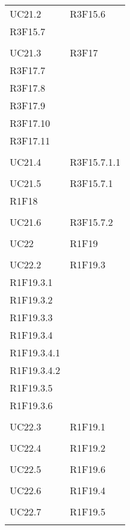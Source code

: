 \begin{longtable}{ >{\centering}p{}
		>{\centering}p{}}
	UC21.2 & R3F15.6\\
	R3F15.7 \\\tabularnewline
	
	UC21.3 & R3F17\\
	R3F17.7 \\R3F17.8 \\R3F17.9 \\R3F17.10 \\R3F17.11 \\\tabularnewline
	
	UC21.4 & R3F15.7.1.1\\
	\tabularnewline
	
	UC21.5 & R3F15.7.1\\
	R1F18 \\\tabularnewline
	
	UC21.6 & R3F15.7.2\\
	\tabularnewline
	
	UC22 & R1F19\\
	\tabularnewline
	
	UC22.2 & R1F19.3\\
	R1F19.3.1 \\R1F19.3.2 \\R1F19.3.3 \\R1F19.3.4 \\R1F19.3.4.1 \\R1F19.3.4.2 \\R1F19.3.5 \\R1F19.3.6 \\\tabularnewline
	
	UC22.3 & R1F19.1\\
	\tabularnewline
	
	UC22.4 & R1F19.2\\
	\tabularnewline
	
	UC22.5 & R1F19.6\\
	\tabularnewline
	
	UC22.6 & R1F19.4\\
	\tabularnewline
	
	UC22.7 & R1F19.5\\
	\tabularnewline
	

\end{longtable}
